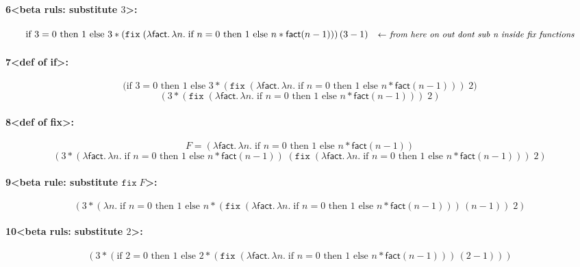 \documentclass{article}
\theoremstyle{theorem}
\theoremstyle{definition}
\theoremstyle{remark}
\begin{document}
\paragraph{6\textless beta ruls: substitute \(3\)\textgreater:}
\[
\text{if } 3=0 \text{ then } 1 \text{ else } 3 * (\texttt{fix}\;(\lambda \mathsf{fact}.\,\lambda n.\; \text{if } n=0 \text{ then } 1 \text{ else } n * \mathsf{fact}(n-1)))\,(3-1)
\quad \textit{\small \(\leftarrow\) from here on out dont sub n inside fix functions}
\]

\paragraph{7\textless def of if\textgreater:}
\[
\big(\text{if } 3=0 \text{ then } 1 \text{ else } 3 * (\texttt{fix}\;(\lambda \mathsf{fact}.\,\lambda n.\; \text{if } n=0 \text{ then } 1 \text{ else } n * \mathsf{fact}(n-1)))\;2\big)
\]
\[
(3 * (\texttt{fix}\;(\lambda \mathsf{fact}.\,\lambda n.\; \text{if } n=0 \text{ then } 1 \text{ else } n * \mathsf{fact}(n-1)))\;2)
\]

\paragraph{8\textless def of fix\textgreater:}
\[
F = (\lambda \mathsf{fact}.\,\lambda n.\; \text{if } n=0 \text{ then } 1 \text{ else } n * \mathsf{fact}(n-1))
\]
\[
(3 * (\lambda \mathsf{fact}.\,\lambda n.\; \text{if } n=0 \text{ then } 1 \text{ else } n * \mathsf{fact}(n-1))\;(\texttt{fix}\;(\lambda \mathsf{fact}.\,\lambda n.\; \text{if } n=0 \text{ then } 1 \text{ else } n * \mathsf{fact}(n-1)))\;2)
\]

\paragraph{9\textless beta rule: substitute \(\texttt{fix}\;F\)\textgreater:}
\[
(3 * (\lambda n.\; \text{if } n=0 \text{ then } 1 \text{ else } n * (\texttt{fix}\;(\lambda \mathsf{fact}.\,\lambda n.\; \text{if } n=0 \text{ then } 1 \text{ else } n * \mathsf{fact}(n-1)))\,(n-1))\;2)
\]

\paragraph{10\textless beta ruls: substitute \(2\)\textgreater:}
\[
(3 * (\text{if } 2=0 \text{ then } 1 \text{ else } 2 * (\texttt{fix}\;(\lambda \mathsf{fact}.\,\lambda n.\; \text{if } n=0 \text{ then } 1 \text{ else } n * \mathsf{fact}(n-1)))\,(2-1)))
\]
\end{document}
